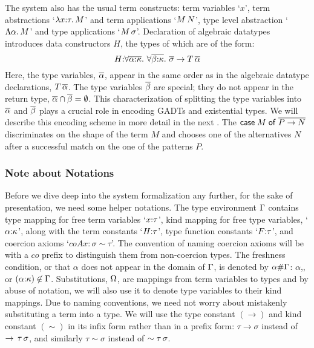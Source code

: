 \documentclass[screen,nonacm]{acmart}
\begin{document}
The system also has the usual term constructs: term variables `$x$',
term abstractions `$\lambda x{:}\tau.\, M$' and term applications `$M \, N$',
type level abstraction `$\Lambda \alpha.\, M$' and type applications
`$M\,\sigma$'. Declaration of algebraic datatypes introduces data
constructors $H$, the types of which are of the form:
\[
H {:} \forall\overline{\alpha{:}\kappa}.~\forall\overline{\beta{:}\kappa}.~\overline{\sigma} \to T\,\overline{\alpha}
\]
Here, the type variables, $\overline{\alpha}$, appear in the same order as in
the algebraic datatype declarations, $T\,\overline{\alpha}$.
The type variables $\overline{\beta}$ are special; they
do not appear in the return type, $\overline{\alpha} \cap \overline{\beta} = \emptyset$. This
characterization of splitting the type variables into $\overline{\alpha}$
and $\overline{\beta}$ plays a crucial role in encoding GADTs and
existential types. We will describe this encoding scheme in more
detail in the next .
The $\mathsf{case}\;M\;\mathsf{of}\;\overline{P \to N}$
discriminates on the shape of the term $M$ and chooses one of the
alternatives $N$ after a successful match on the one of the patterns
$P$.



\subsubsection{Note about Notations}\label{sec:notations}
Before we dive deep into the system formalization any further, for the
sake of presentation, we need
some helper notations.
The type environment $\Gamma$ contains type mapping for free term variables
`$x{:}\tau$', kind mapping for free type variables,
`$\alpha{:}\kappa$', along with the term constants `$H{:}\tau$', type
function constants `$F{:} \tau$', and coercion axioms
`$coAx:\sigma\sim\tau$'. The convention of naming
coercion axioms will be with a $co$ prefix to distinguish them from
non-coercion types. The freshness condition, or that $\alpha$ does not appear in the
domain of $\Gamma$, is denoted by $\alpha \# \Gamma$: $\alpha$,, or
$(\alpha{:}\kappa) \not\in \Gamma$. Substitutions, $\Omega$, are mappings from term variables to
types and by abuse of notation, we will also use it to denote type
variables to their kind mappings. Due to naming conventions, we need
not worry about mistakenly substituting a term into a type. We will
use the type constant $(\to)$ and kind constant $(\sim)$ in its infix
form rather than in a prefix form: $\tau \to \sigma$ instead of
$\to \,\tau\,\sigma$, and similarly $\tau\sim\sigma$ instead of
$\sim \tau\,\sigma$.
\end{document}
